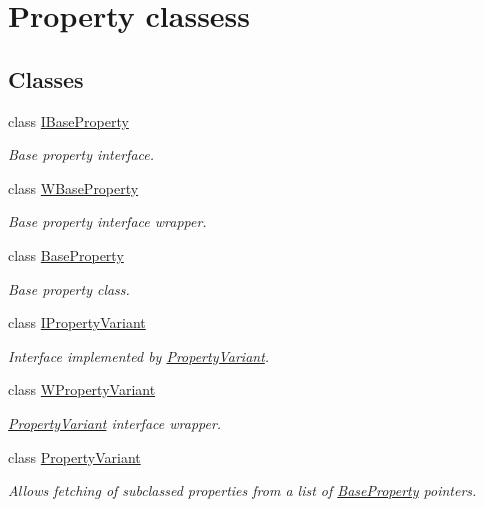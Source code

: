 \hypertarget{group___property_classes}{\section{Property classess}
\label{group___property_classes}
}
\subsection*{Classes}
\begin{DoxyCompactItemize}
\item 
class \hyperlink{class_i_base_property}{I\-Base\-Property}
\begin{DoxyCompactList}\small\item\em Base property interface. \end{DoxyCompactList}\item 
class \hyperlink{class_w_base_property}{W\-Base\-Property}
\begin{DoxyCompactList}\small\item\em Base property interface wrapper. \end{DoxyCompactList}\item 
class \hyperlink{class_base_property}{Base\-Property}
\begin{DoxyCompactList}\small\item\em Base property class. \end{DoxyCompactList}\item 
class \hyperlink{class_i_property_variant}{I\-Property\-Variant}
\begin{DoxyCompactList}\small\item\em Interface implemented by \hyperlink{class_property_variant}{Property\-Variant}. \end{DoxyCompactList}\item 
class \hyperlink{class_w_property_variant}{W\-Property\-Variant}
\begin{DoxyCompactList}\small\item\em \hyperlink{class_property_variant}{Property\-Variant} interface wrapper. \end{DoxyCompactList}\item 
class \hyperlink{class_property_variant}{Property\-Variant}
\begin{DoxyCompactList}\small\item\em Allows fetching of subclassed properties from a list of \hyperlink{class_base_property}{Base\-Property} pointers. \end{DoxyCompactList}\item 

\end{DoxyCompactItemize}
